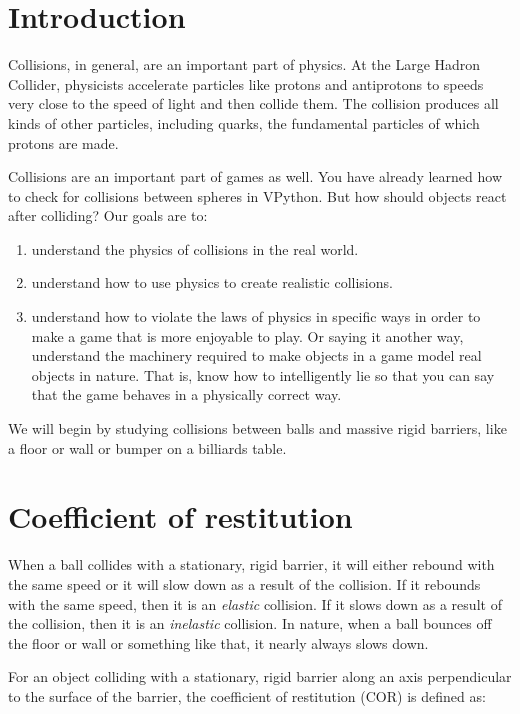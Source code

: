 
\section*{Introduction}

Collisions, in general, are an important part of physics. At the Large Hadron Collider, physicists accelerate particles like protons and antiprotons to speeds very close to the speed of light and then collide them. The collision produces all kinds of other particles, including quarks, the fundamental particles of which protons are made.

Collisions are an important part of games as well. You have already learned how to check for collisions between spheres in VPython. But how should objects react after colliding?  Our goals are to:

\begin{enumerate}
	\item understand the physics of collisions in the real world.
	\item understand how to use physics to create realistic collisions.
	\item understand how to violate the laws of physics in specific ways in order to make a game that is more enjoyable to play. Or saying it another way, understand the machinery required to make objects in a game model real objects in nature. That is, know how to intelligently lie so that you can say that the game behaves in a physically correct way.
\end{enumerate}

We will begin by studying collisions between balls and massive rigid barriers, like a floor or wall or bumper on a billiards table.

\section*{Coefficient of restitution}

When a ball collides with a stationary, rigid barrier, it will either rebound with the same speed or it will slow down as a result of the collision. If it rebounds with the same speed, then it is an \emph{elastic} collision. If it slows down as a result of the collision, then it is an \emph{inelastic} collision. In nature, when a ball bounces off the floor or wall or something like that, it nearly always slows down. 

For an object colliding with a stationary, rigid barrier along an axis perpendicular to the surface of the barrier, the coefficient of restitution (COR) is defined as:


